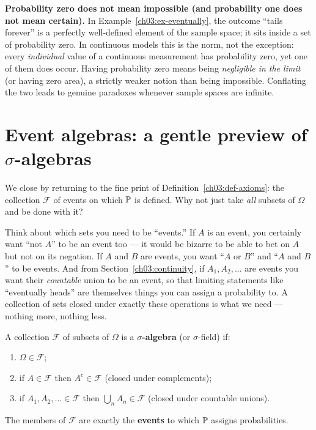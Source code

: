 \begin{trapbox}
\textbf{Probability zero does not mean impossible (and probability one does not
mean certain).} In Example~\ref{ch03:ex-eventually}, the outcome ``tails forever''
is a perfectly well-defined element of the sample space; it sits inside a set
of probability zero. In continuous models this is the norm, not the exception:
every \emph{individual} value of a continuous measurement has probability zero,
yet one of them does occur. Having probability zero means being \emph{negligible
in the limit} (or having zero area), a strictly weaker notion than being
impossible. Conflating the two leads to genuine paradoxes whenever sample spaces
are infinite.
\end{trapbox}

\section{Event algebras: a gentle preview of $\sigma$-algebras}
\label{ch03:algebra}

We close by returning to the fine print of Definition~\ref{ch03:def-axioms}: the
collection $\mathcal{F}$ of events on which $\P$ is defined. Why not just take
\emph{all} subsets of $\Omega$ and be done with it?

\begin{intuitionbox}
Think about which sets you need to be ``events.'' If $A$ is an event,
you certainly want ``not $A$'' to be an event too --- it would be bizarre to be
able to bet on $A$ but not on its negation. If $A$ and $B$ are events, you want
``$A$ or $B$'' and ``$A$ and $B$'' to be events. And from
Section~\ref{ch03:continuity}, if $A_1, A_2, \dots$ are events you want their
\emph{countable} union to be an event, so that limiting statements like
``eventually heads'' are themselves things you can assign a probability to. A
collection of sets closed under exactly these operations is what we need ---
nothing more, nothing less.
\end{intuitionbox}

\begin{definition}
\label{ch03:def-sigma-algebra}
A collection $\mathcal{F}$ of subsets of $\Omega$ is a \textbf{$\sigma$-algebra}
(or $\sigma$-field) if:
\begin{enumerate}
\item $\Omega \in \mathcal{F}$;
\item if $A \in \mathcal{F}$ then $A^c \in \mathcal{F}$ (closed under
complements);
\item if $A_1, A_2, \dots \in \mathcal{F}$ then $\bigcup_{n} A_n \in \mathcal{F}$
(closed under countable unions).
\end{enumerate}
The members of $\mathcal{F}$ are exactly the \textbf{events} to which $\P$ assigns
probabilities.
\end{definition}

